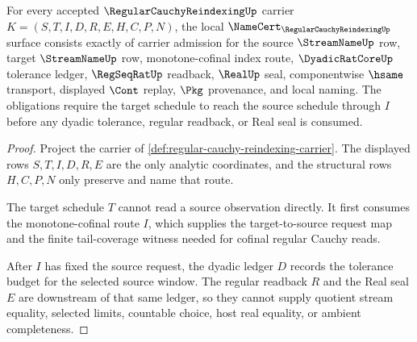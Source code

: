 \begin{theorem}
\label{thm:regular-cauchy-reindexing-namecert-obligations}
For every accepted $\RegularCauchyReindexingUp$ carrier $K=(S,T,I,D,R,E,H,C,P,N)$, the local $\NameCert_{\RegularCauchyReindexingUp}$ surface consists exactly of carrier admission for the source $\StreamNameUp$ row, target $\StreamNameUp$ row, monotone-cofinal index route, $\DyadicRatCoreUp$ tolerance ledger, $\RegSeqRatUp$ readback, $\RealUp$ seal, componentwise $\hsame$ transport, displayed $\Cont$ replay, $\Pkg$ provenance, and local naming. The obligations require the target schedule to reach the source schedule through $I$ before any dyadic tolerance, regular readback, or Real seal is consumed.
\end{theorem}
\begin{proof}
Project the carrier of \autoref{def:regular-cauchy-reindexing-carrier}. The displayed rows $S,T,I,D,R,E$ are the only analytic coordinates, and the structural rows $H,C,P,N$ only preserve and name that route.

The target schedule $T$ cannot read a source observation directly. It first consumes the monotone-cofinal route $I$, which supplies the target-to-source request map and the finite tail-coverage witness needed for cofinal regular Cauchy reads.

After $I$ has fixed the source request, the dyadic ledger $D$ records the tolerance budget for the selected source window. The regular readback $R$ and the Real seal $E$ are downstream of that same ledger, so they cannot supply quotient stream equality, selected limits, countable choice, host real equality, or ambient completeness.
\end{proof}

